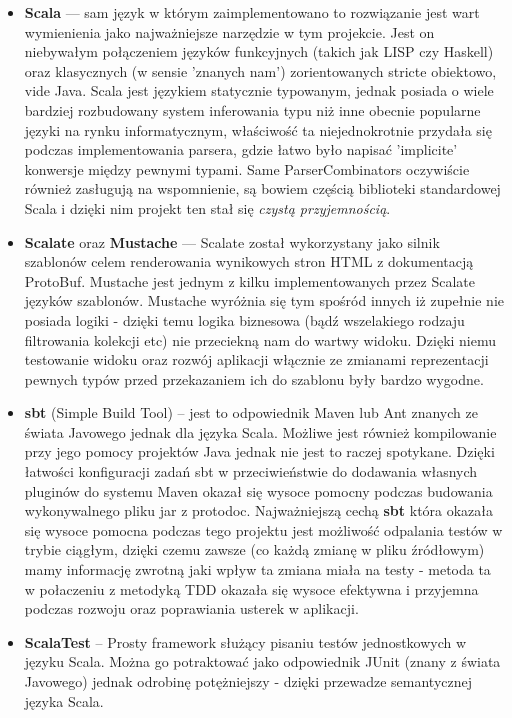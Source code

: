 \documentclass[a4paper]{article}
\begin{document}
\begin{itemize}
 \item \textbf{Scala} --- sam język w którym zaimplementowano to rozwiązanie jest wart wymienienia 
                        jako najważniejsze narzędzie w tym projekcie. Jest on niebywałym połączeniem języków funkcyjnych (takich jak LISP czy Haskell)
                        oraz klasycznych (w sensie 'znanych nam') zorientowanych stricte obiektowo, vide Java. Scala jest językiem statycznie typowanym,
                        jednak posiada o wiele bardziej rozbudowany system inferowania typu niż inne obecnie popularne języki na rynku informatycznym,
                        właściwość ta niejednokrotnie przydała się podczas implementowania parsera, gdzie łatwo było napisać 'implicite' konwersje między pewnymi typami.
                        Same ParserCombinators oczywiście również zasługują na wspomnienie, są bowiem częścią biblioteki standardowej Scala i dzięki nim projekt ten stał się \textit{czystą przyjemnością}.
 \item \textbf{Scalate} oraz \textbf{Mustache} --- Scalate został wykorzystany jako silnik szablonów celem renderowania wynikowych stron HTML z dokumentacją ProtoBuf.
                                                   Mustache jest jednym z kilku implementowanych przez Scalate języków szablonów. Mustache wyróżnia się tym spośród innych
                                                   iż zupełnie nie posiada logiki - dzięki temu logika biznesowa (bądź wszelakiego rodzaju filtrowania kolekcji etc)
                                                   nie przeciekną nam do wartwy widoku. Dzięki niemu testowanie widoku oraz rozwój aplikacji włącznie ze zmianami reprezentacji
                                                   pewnych typów przed przekazaniem ich do szablonu były bardzo wygodne.
 \item \textbf{sbt} (Simple Build Tool) -- jest to odpowiednik Maven lub Ant znanych ze świata Javowego jednak dla języka Scala. Możliwe jest również kompilowanie
                                           przy jego pomocy projektów Java jednak nie jest to raczej spotykane. Dzięki łatwości konfiguracji zadań sbt w przeciwieństwie
                                           do dodawania własnych pluginów do systemu Maven okazał się wysoce pomocny podczas budowania wykonywalnego pliku jar z protodoc.
                                           Najważniejszą cechą \textbf{sbt} która okazała się wysoce pomocna podczas tego projektu jest możliwość odpalania testów w trybie ciągłym,
                                           dzięki czemu zawsze (co każdą zmianę w pliku źródłowym) mamy informację zwrotną jaki wpływ ta zmiana miała na testy - metoda
                                           ta w połaczeniu z metodyką TDD okazała się wysoce efektywna i przyjemna podczas rozwoju oraz poprawiania usterek w aplikacji.
 \item \textbf{ScalaTest} -- Prosty framework służący pisaniu testów jednostkowych w języku Scala.
                             Można go potraktować jako odpowiednik JUnit (znany z świata Javowego) jednak odrobinę potężniejszy - dzięki przewadze semantycznej języka Scala.
\end{itemize}
\end{document}
